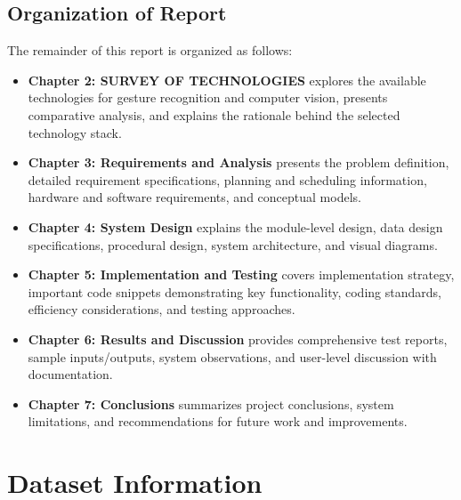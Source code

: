 \documentclass[12pt,a4paper]{report}
\begin{document}
\section{Organization of Report}

The remainder of this report is organized as follows:

\begin{itemize}
    \item \textbf{Chapter 2: SURVEY OF TECHNOLOGIES} explores the available technologies for gesture recognition and computer vision, presents comparative analysis, and explains the rationale behind the selected technology stack.
    \item \textbf{Chapter 3: Requirements and Analysis} presents the problem definition, detailed requirement specifications, planning and scheduling information, hardware and software requirements, and conceptual models.
    \item \textbf{Chapter 4: System Design} explains the module-level design, data design specifications, procedural design, system architecture, and visual diagrams.
    \item \textbf{Chapter 5: Implementation and Testing} covers implementation strategy, important code snippets demonstrating key functionality, coding standards, efficiency considerations, and testing approaches.
    \item \textbf{Chapter 6: Results and Discussion} provides comprehensive test reports, sample inputs/outputs, system observations, and user-level discussion with documentation.
    \item \textbf{Chapter 7: Conclusions} summarizes project conclusions, system limitations, and recommendations for future work and improvements.
\end{itemize}

\newpage


\newpage


\newpage


\newpage


\newpage


\newpage


\newpage

\nocite{*}


\newpage
\appendix
\chapter{Dataset Information}
\end{document}
